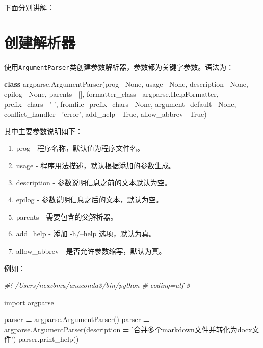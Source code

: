 \documentclass[]{ctexbook}
\newenvironment{Shaded}{\begin{snugshade}}{\end{snugshade}}
\newcommand{\CommentTok}[1]{\textcolor[rgb]{0.56,0.35,0.01}{\textit{#1}}}
\newcommand{\ImportTok}[1]{#1}
\newcommand{\KeywordTok}[1]{\textcolor[rgb]{0.13,0.29,0.53}{\textbf{#1}}}
\newcommand{\NormalTok}[1]{#1}
\newcommand{\OperatorTok}[1]{\textcolor[rgb]{0.81,0.36,0.00}{\textbf{#1}}}
\newcommand{\StringTok}[1]{\textcolor[rgb]{0.31,0.60,0.02}{#1}}
\newcommand{\VariableTok}[1]{\textcolor[rgb]{0.00,0.00,0.00}{#1}}
\providecommand{\tightlist}{%
  \setlength{\itemsep}{0pt}\setlength{\parskip}{0pt}}
\begin{document}
下面分别讲解：

\hypertarget{ux521bux5efaux89e3ux6790ux5668}{%
\section{创建解析器}\label{ux521bux5efaux89e3ux6790ux5668}}

使用\texttt{ArgumentParser}类创建参数解析器，参数都为关键字参数。语法为：

\begin{Shaded}
\begin{Highlighting}[]
\KeywordTok{class}\NormalTok{ argparse.ArgumentParser(prog}\OperatorTok{=}\VariableTok{None}\NormalTok{, usage}\OperatorTok{=}\VariableTok{None}\NormalTok{, description}\OperatorTok{=}\VariableTok{None}\NormalTok{, epilog}\OperatorTok{=}\VariableTok{None}\NormalTok{, parents}\OperatorTok{=}\NormalTok{[], formatter_class}\OperatorTok{=}\NormalTok{argparse.HelpFormatter, prefix_chars}\OperatorTok{=}\StringTok{'-'}\NormalTok{, fromfile_prefix_chars}\OperatorTok{=}\VariableTok{None}\NormalTok{, argument_default}\OperatorTok{=}\VariableTok{None}\NormalTok{, conflict_handler}\OperatorTok{=}\StringTok{'error'}\NormalTok{, add_help}\OperatorTok{=}\VariableTok{True}\NormalTok{, allow_abbrev}\OperatorTok{=}\VariableTok{True}\NormalTok{)}
\end{Highlighting}
\end{Shaded}

其中主要参数说明如下：

\begin{enumerate}
\def\labelenumi{\arabic{enumi}.}
\tightlist
\item
  prog - 程序名称，默认值为程序文件名。
\item
  usage - 程序用法描述，默认根据添加的参数生成。
\item
  description - 参数说明信息之前的文本默认为空。
\item
  epilog - 参数说明信息之后的文本，默认为空。
\item
  parents - 需要包含的父解析器。
\item
  add\_help - 添加 -h/--help 选项，默认为真。
\item
  allow\_abbrev - 是否允许参数缩写，默认为真。
\end{enumerate}

例如：

\begin{Shaded}
\begin{Highlighting}[]
\CommentTok{#! /Users/ncsxbmu/anaconda3/bin/python}
\CommentTok{# coding=utf-8}

\ImportTok{import}\NormalTok{ argparse}

\NormalTok{parser }\OperatorTok{=}\NormalTok{ argparse.ArgumentParser()}
\NormalTok{parser }\OperatorTok{=}\NormalTok{ argparse.ArgumentParser(description }\OperatorTok{=} \StringTok{'合并多个markdown文件并转化为docx文件'}\NormalTok{)}
\NormalTok{parser.print_help()}
\end{Highlighting}
\end{Shaded}
\end{document}
